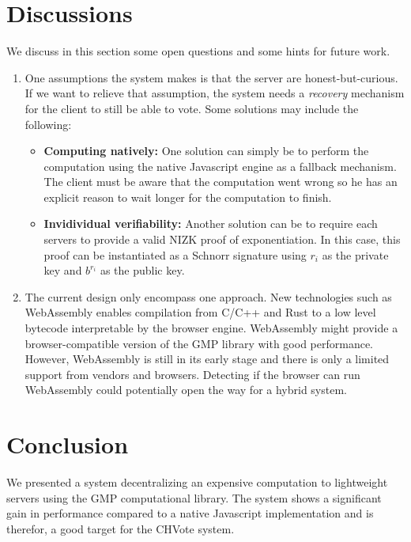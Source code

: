 \documentclass[]{article}
\begin{document}
\section{Discussions} \label{discussions}

We discuss in this section some open questions and some hints for future work. 

\begin{enumerate} 
    \item One assumptions the system makes is that the server are
        honest-but-curious. If we want to relieve that assumption, the system
        needs a \textit{recovery} mechanism for the client to still be able to
        vote.  Some solutions may include the following: 
        \begin{itemize} 
            \item \textbf{Computing natively:} One solution can simply be to
                perform the computation using the native Javascript engine as a
                fallback mechanism. The client must be aware that the
                computation went wrong so he has an explicit reason to wait
                longer for the computation to finish.  
            \item \textbf{Invidividual verifiability:} Another solution can be
                to require each servers to provide a valid NIZK proof of
                exponentiation. In this case, this proof can be instantiated as
                a Schnorr signature using $r_i$ as the private key and $b^{r_i}$
                as the public key.  
        \end{itemize} 
    \item The current design only encompass one approach. New technologies such
        as WebAssembly \cite{wasm} enables compilation from C/C++ and Rust to a
        low level bytecode interpretable by the browser engine. WebAssembly
        might provide a browser-compatible version of the GMP library with good
        performance. However, WebAssembly is still in its early stage and there
        is only a limited support from vendors and browsers. Detecting if the
        browser can run WebAssembly could potentially open the way for a hybrid
        system.
\end{enumerate}

\section{Conclusion}

We presented a system decentralizing an expensive computation to lightweight
servers using the GMP computational library. The system shows a significant gain
in performance compared to a native Javascript implementation and is therefor,
a good target for the CHVote system.




\end{document}
